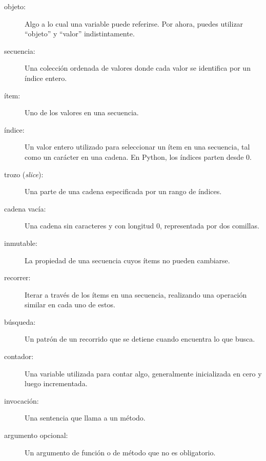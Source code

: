\documentclass[10pt]{book}
\begin{document}
\begin{description}

\item[objeto:] Algo a lo cual una variable puede referirse.  Por ahora,
puedes utilizar ``objeto'' y ``valor'' indistintamente.

\item[secuencia:] Una colección ordenada de
valores donde cada valor se identifica por un índice entero.

\item[ítem:] Uno de los valores en una secuencia.

\item[índice:] Un valor entero utilizado para seleccionar un ítem en
una secuencia, tal como un carácter en una cadena.  En Python,
los índices parten desde 0.

\item[trozo ({\em slice}):] Una parte de una cadena especificada por un rango de índices.

\item[cadena vacía:] Una cadena sin caracteres y con longitud 0, representada
por dos comillas.

\item[inmutable:] La propiedad de una secuencia cuyos ítems no pueden
cambiarse.

\item[recorrer:] Iterar a través de los ítems en una secuencia,
realizando una operación similar en cada uno de estos.

\item[búsqueda:] Un patrón de un recorrido que se detiene
cuando encuentra lo que busca.

\item[contador:] Una variable utilizada para contar algo, generalmente inicializada
en cero y luego incrementada.

\item[invocación:] Una sentencia que llama a un método.

\item[argumento opcional:] Un argumento de función o de método que no es
obligatorio.

\end{description}
\end{document}
